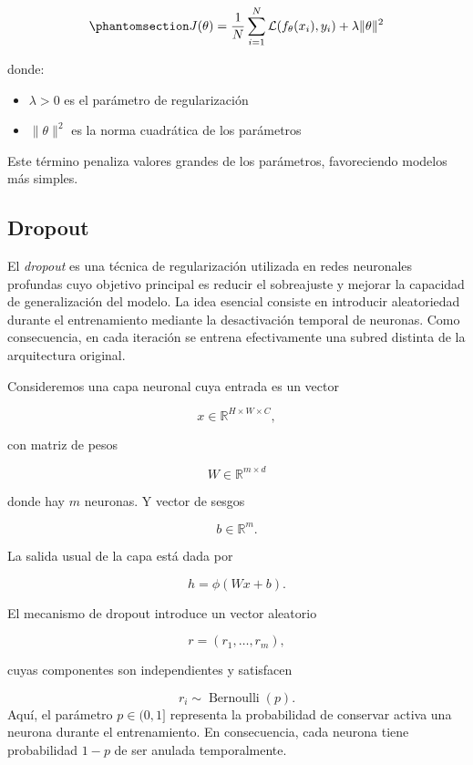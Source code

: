 \documentclass[
  spanish,
  us-letterpaper,
  DIV=11,
  numbers=noendperiod]{scrreprt}
\providecommand{\tightlist}{%
  \setlength{\itemsep}{0pt}\setlength{\parskip}{0pt}}
\begin{document}
\begin{equation}\phantomsection\label{eq-regularizacion-l2}{
J(\theta) = \frac{1}{N} \sum_{i=1}^{N} \mathcal{L}(f_\theta(x_i), y_i) + \lambda \|\theta\|^2
}\end{equation}

donde:

\begin{itemize}
\tightlist
\item
  \(\lambda > 0\) es el parámetro de regularización\\
\item
  \(\|\theta\|^2\) es la norma cuadrática de los parámetros
\end{itemize}

Este término penaliza valores grandes de los parámetros, favoreciendo
modelos más simples.

\subsection{Dropout}\label{dropout}

El \emph{dropout} es una técnica de regularización utilizada en redes
neuronales profundas cuyo objetivo principal es reducir el sobreajuste y
mejorar la capacidad de generalización del modelo. La idea esencial
consiste en introducir aleatoriedad durante el entrenamiento mediante la
desactivación temporal de neuronas. Como consecuencia, en cada iteración
se entrena efectivamente una subred distinta de la arquitectura
original.

Consideremos una capa neuronal cuya entrada es un vector

\[
x \in \mathbb{R}^{H\times W\times C},
\]

con matriz de pesos

\[
W \in \mathbb{R}^{m\times d}
\]

donde hay \(m\) neuronas. Y vector de sesgos

\[
b\in\mathbb{R}^m.
\]

La salida usual de la capa está dada por

\[
h=\phi(Wx+b).
\]

El mecanismo de dropout introduce un vector aleatorio

\[
r=(r_1,\dots,r_m),
\]

cuyas componentes son independientes y satisfacen

\[
r_i\sim\operatorname{Bernoulli}(p).
\] Aquí, el parámetro \(p\in(0,1]\) representa la probabilidad de
conservar activa una neurona durante el entrenamiento. En consecuencia,
cada neurona tiene probabilidad \(1-p\) de ser anulada temporalmente.
\end{document}
